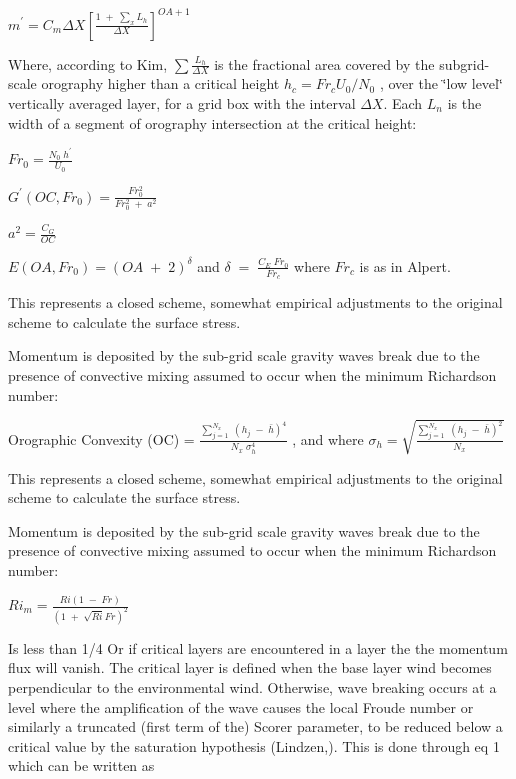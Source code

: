 $ m^{'} = C_{m} \Delta X \left[ \frac{1 \; + \; \sum\limits_{x} L_{h} }{\Delta X} \right]^{OA+1} $

Where, according to Kim, $ \sum \frac{L_{h}}{\Delta X} $ is the fractional area covered by the subgrid-\/scale orography higher than a critical height $ h_{c} = Fr_{c} U_{0}/N_{0} $ , over the \char`\"{}low level\char`\"{} vertically averaged layer, for a grid box with the interval $ \Delta X $. Each $ L_{n}$ is the width of a segment of orography intersection at the critical height\+:

$ Fr_{0} = \frac{N_{0} \; h^{'}}{U_{0}} $

$ G^{'}(OC,Fr_{0}) = \frac{Fr_{0}^{2}}{Fr_{0}^{2} \; + \; a^{2}} $

$ a^{2} = \frac{C_{G}}{OC} $

$ E(OA, Fr_{0}) = (OA \; + \; 2)^{\delta} $ and $ \delta \; = \; \frac{C_{E} \; Fr_{0}}{Fr_{c}} $ where $ Fr_{c} $ is as in Alpert.

This represents a closed scheme, somewhat empirical adjustments to the original scheme to calculate the surface stress.

Momentum is deposited by the sub-\/grid scale gravity waves break due to the presence of convective mixing assumed to occur when the minimum Richardson number\+:

Orographic Convexity (OC) = $ \frac{ \sum\limits_{j=1}^{N_{x}} \; (h_{j} \; - \; \bar{h})^4 }{N_{x} \;\sigma_{h}^4} $ , and where $ \sigma_{h} = \sqrt{ \frac{\sum\limits_{j=1}^{N_{x}} \; (h_{j} \; - \; \bar{h} )^2}{N_{x}} } $

This represents a closed scheme, somewhat empirical adjustments to the original scheme to calculate the surface stress.

Momentum is deposited by the sub-\/grid scale gravity waves break due to the presence of convective mixing assumed to occur when the minimum Richardson number\+:

$ Ri_{m} = \frac{Ri(1 \; - \; Fr)}{(1 \; + \; \sqrt{Ri}Fr)^2} $

Is less than 1/4 Or if critical layers are encountered in a layer the the momentum flux will vanish. The critical layer is defined when the base layer wind becomes perpendicular to the environmental wind. Otherwise, wave breaking occurs at a level where the amplification of the wave causes the local Froude number or similarly a truncated (first term of the) Scorer parameter, to be reduced below a critical value by the saturation hypothesis (Lindzen,). This is done through eq 1 which can be written as

